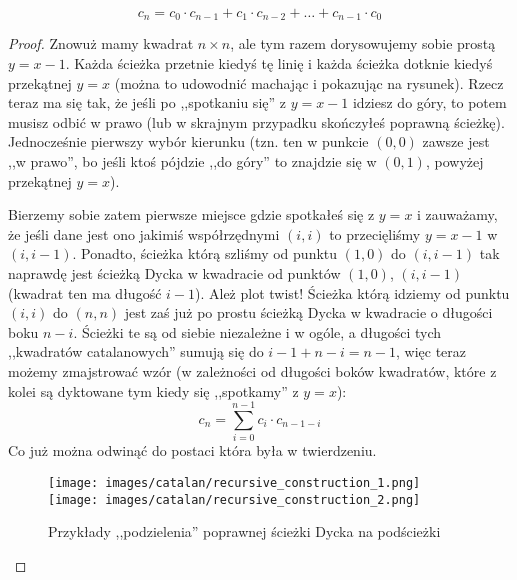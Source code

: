            \begin{theorem}
                \begin{equation}
                    c_n = c_{0} \cdot c_{n-1} + c_{1} \cdot c_{n - 2} + \dots + c_{n-1} \cdot c_0
                \end{equation}
            \end{theorem}

            \begin{proof}
                Znowuż mamy kwadrat $n \times n$, ale tym razem dorysowujemy sobie prostą $y = x - 1$. Każda ścieżka przetnie kiedyś tę linię i każda ścieżka dotknie kiedyś przekątnej $y = x$ (można to udowodnić machając i pokazując na rysunek). Rzecz teraz ma się tak, że jeśli po ,,spotkaniu się'' z $y = x - 1$ idziesz do góry, to potem musisz odbić w prawo (lub w skrajnym przypadku skończyłeś poprawną ścieżkę). Jednocześnie pierwszy wybór kierunku (tzn. ten w punkcie $(0,0)$ zawsze jest ,,w prawo'', bo jeśli ktoś pójdzie ,,do góry'' to znajdzie się w $(0,1)$, powyżej przekątnej $y = x$).

                Bierzemy sobie zatem pierwsze miejsce gdzie spotkałeś się z $y = x$ i zauważamy, że jeśli dane jest ono jakimiś współrzędnymi $(i,i)$ to przecięliśmy $y = x-1$ w $(i,i-1)$. Ponadto, ścieżka którą szliśmy od punktu $(1,0)$ do $(i,i-1)$ tak naprawdę jest ścieżką Dycka w kwadracie od punktów $(1,0)$, $(i, i-1)$ (kwadrat ten ma długość $i-1$). Ależ plot twist! Ścieżka którą idziemy od punktu $(i,i)$ do $(n,n)$ jest zaś już po prostu ścieżką Dycka w kwadracie o długości boku $n-i$. Ścieżki te są od siebie niezależne i w ogóle, a długości tych ,,kwadratów catalanowych'' sumują się do $i - 1 + n - i = n - 1$, więc teraz możemy zmajstrować wzór (w zależności od długości boków kwadratów, które z kolei są dyktowane tym kiedy się ,,spotkamy'' z $y = x$):
                \begin{equation*}
                    c_n = \sum_{i = 0}^{n-1} c_i \cdot c_{n-1-i}
                \end{equation*}
                  Co już można odwinąć do postaci która była w twierdzeniu. 
                  
            \begin{figure}[H]
                \centering
                \texttt{[image: images/catalan/recursive\_construction\_1.png]}
                \texttt{[image: images/catalan/recursive\_construction\_2.png]}

                \caption{Przykłady ,,podzielenia'' poprawnej ścieżki Dycka na podścieżki}
            \end{figure}
            
            \end{proof}